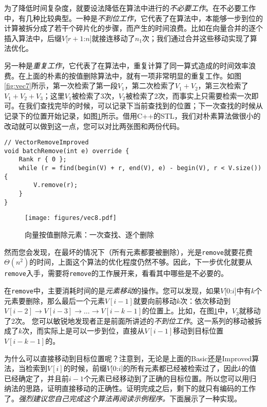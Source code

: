 为了降低时间复杂度，就要设法降低在算法中进行的\textit{不必要工作}。在不必要工作中，有几种比较典型。一种是\textit{不到位工作}，它代表了在算法中，本能够一步到位的计算被拆分成了若干个碎片化的步骤，而产生的时间浪费。比如在向量合并的逐个插入算法中，后缀$V[r+1$:$n]$就接连移动了$n_1$次；我们通过合并这些移动实现了算法优化。

另一种是\textit{重复工作}，它代表了在算法中，重复计算了同一算式造成的时间效率浪费。在上面的朴素的按值删除算法中，就有一项非常明显的重复工作。如图\ref{fig:vec7}所示，第一次检索了第一段$V_1$，第二次检索了$V_1+V_2$，第三次检索了$V_1+V_2+V_3$；这里$V_1$被检索了3次，$V_2$被检索了2次，而事实上只需要检索一次即可。在我们查找完毕的时候，可以记录下当前查找到的位置；下一次查找的时候从记录下的位置开始记录，如图\ref{fig:vec8}所示。借用C++的STL，我们对朴素算法做很小的改动就可以做到这一点，您可以对比两张图和两份代码。

\begin{lstlisting}
// VectorRemoveImproved
void batchRemove(int e) override {
    Rank r { 0 };
    while (r = find(begin(V) + r, end(V), e) - begin(V), r < V.size()) {
        V.remove(r);
    }
}
\end{lstlisting}

\begin{figure}
  \centering
  \texttt{[image: figures/vec8.pdf]}
  \caption{向量按值删除元素：一次查找、逐个删除}
  \label{fig:vec8}
\end{figure}

然而您会发现，在最坏的情况下（所有元素都要被删除），光是\lstinline{remove}就要花费$\Theta(n^2)$的时间，上面这个算法的优化程度仍然不够。因此，下一步优化就要从\lstinline{remove}入手，需要将\lstinline{remove}的工作展开来，看看其中哪些是不必要的。

在\lstinline{remove}中，主要消耗时间的是\textit{元素移动}的操作。您可以发现，如果$V[0$:$i]$中有$k$个元素要删除，那么最后一个元素$V[i-1]$就要向前移动$k$次：依次移动到$V[i-2]\to V[i-3]\to \dots\to V[i-k-1]$的位置上。比如，在图\ref{fig:vec8}中，$V_3$就移动了2次。
您可以敏锐地发现者正是前面所讲述的\textit{不到位工作}。这一系列的移动被拆成了$k$次，而实际上是可以一步到位，直接从$V[i-1]$移动到目标位置$V[i-k-1]$的。

为什么可以直接移动到目标位置呢？注意到，无论是上面的Basic还是Improved算法，当检索到$V[i]$的时候，前缀$V[0$:$i]$的所有元素都已经被检索过了，因此$k$的值已经确定了，并且前$i-1$个元素已经移动到了正确的目标位置。所以您可以用归纳法的思路，证明直接移动的正确性。证明完成之后，剩下的就只有编码的工作了。\textit{强烈建议您自己完成这个算法再阅读示例程序。}下面展示了一种实现。

